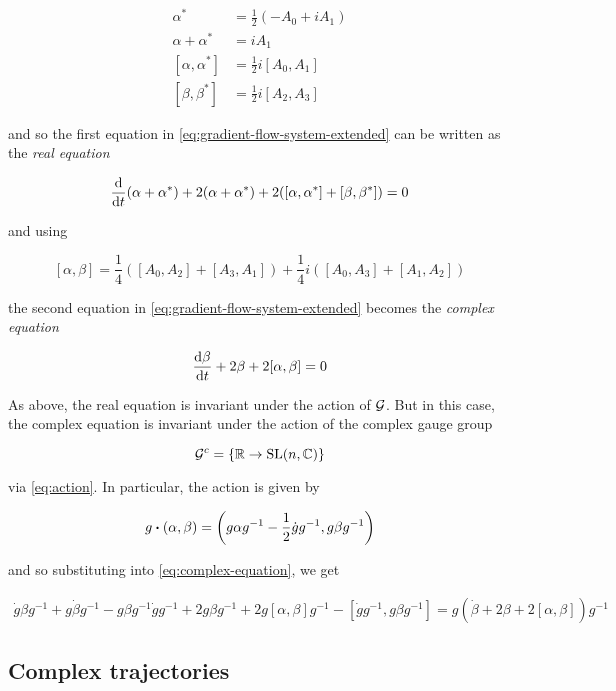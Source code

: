 \documentclass{article}
\begin{document}
\begin{align*}
    \alpha^* &= \frac{1}{2}(-A_0 + iA_1) \\
    \alpha + \alpha^* &= iA_1 \\
    [\alpha, \alpha^*] &= \frac12i[A_0, A_1] \\
    [\beta, \beta^*] &= \frac12i[A_2, A_3]
\end{align*}

and so the first equation in \cref{eq:gradient-flow-system-extended} can be written as the \emph{real equation}

\begin{equation}
    \label{eq:real-equation}
    \dv{t}(\alpha + \alpha^*) + 2(\alpha + \alpha^*) + 2([\alpha, \alpha^*] + [\beta, \beta^*]) = 0
\end{equation}

and using

\[[\alpha, \beta] = \frac14\left([A_0, A_2] + [A_3, A_1]\right) + \frac14i\left([A_0, A_3] + [A_1, A_2]\right)\]

the second equation in \cref{eq:gradient-flow-system-extended} becomes the \emph{complex equation}

\begin{equation}
    \label{eq:complex-equation}
    \dv{\beta}{t} + 2\beta + 2[\alpha, \beta] = 0
\end{equation}

As above, the real equation is invariant under the action of \(\mathcal{G}\). But in this case, the complex equation is invariant under the action of the complex gauge group

\[\mathcal{G}^c = \left\{\mathbb{R} \to \operatorname{SL}(n, \mathbb{C})\right\}\]

via \cref{eq:action}. In particular, the action is given by

\[g \vdot (\alpha, \beta) = \left(g\alpha g^{-1} - \frac{1}{2}\dot g g^{-1}, g\beta g^{-1}\right)\]

and so substituting into \cref{eq:complex-equation}, we get

\begin{align*}
    \dot g \beta g^{-1} + g\dot\beta g^{-1} - g\beta g^{-1}\dot g g^{-1} + 2 g\beta g^{-1} + 2 g[\alpha, \beta]g^{-1} - [\dot g g^{-1}, g\beta g^{-1}] = g\left(\dot\beta + 2\beta + 2[\alpha,\beta]\right)g^{-1}
\end{align*}

\subsection{Complex trajectories}
\end{document}
